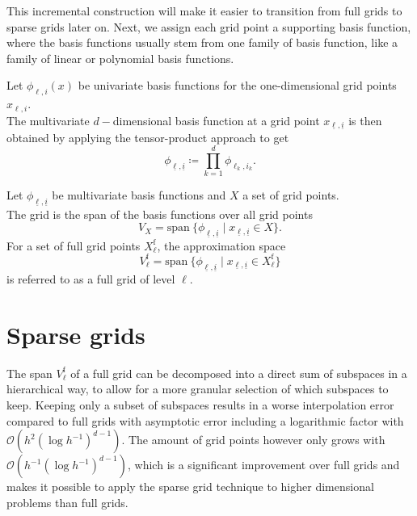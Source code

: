 \documentclass[
  a4paper,  %
  twoside,  %
  bibliography=totoc,
  headsepline,
  cleardoublepage=empty,
  parskip=half,
  draft=false
]{scrbook}
\begin{document}
This incremental construction will make it easier to transition from full grids to sparse grids later on.
Next, we assign each grid point a supporting basis function, where the basis functions usually stem from one family of basis function, like a family of linear or polynomial basis functions.

\begin{definition}
Let $\phi_{\ell,i}(x)$ be univariate basis functions for the one-dimensional grid points $x_{\ell,i}$.\\
The multivariate $d-$dimensional basis function at a grid point $x_{\underline{\ell},\underline{i}}$ is then obtained by applying the tensor-product approach to get
\begin{equation}
\phi_{\underline{\ell},\underline{i}} \coloneqq \prod_{k=1}^{d} \phi_{\ell_k,i_k}.
\label{eq:basis_functions}
\end{equation}
\end{definition}

\begin{definition}
Let $\phi_{\underline{\ell},\underline{i}}$ be multivariate basis functions and $X$ a set of grid points.\\
The grid is the span of the basis functions over all grid points
\begin{equation}
V_{X}=\text{span}~ \{\phi_{\underline{\ell},\underline{i}} \mid x_{\underline{\ell},\underline{i}} \in X\}.
\end{equation}
For a set of full grid points $X^{\text{f}}_{\ell}$, the approximation space
\begin{equation}
V^{\text{f}}_{\ell}=\text{span}~ \{\phi_{\underline{\ell},\underline{i}} \mid x_{\underline{\ell},\underline{i}} \in X^{\text{f}}_{\ell}\}
\label{eq:full_grid}
\end{equation}
is referred to as a full grid of level $\ell$.

\end{definition}


\section{Sparse grids}

The span $V^{\text{f}}_{\ell}$ of a full grid can be decomposed into a direct sum of subspaces in a hierarchical way, to allow for a more granular selection of which subspaces to keep.
Keeping only a subset of subspaces results in a worse interpolation error compared to full grids with asymptotic error including a logarithmic factor with $\mathcal{O}(h^2 (\log h^{-1})^{d-1})$.
The amount of grid points however only grows with $\mathcal{O}(h^{-1} (\log h^{-1})^{d-1})$, which is a significant improvement over full grids and makes it possible to apply the sparse grid technique to higher dimensional problems than full grids.
\end{document}
